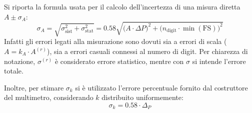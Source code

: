 \label{sec:appendice}
Si riporta la formula usata per il calcolo dell'incertezza di una misura diretta $A \pm \sigma _A$:
\[  \sigma_A =\sqrt{ \sigma_{\textrm{sist}}^2 + \sigma_{\textrm{stat}}^2}= 0.58 \sqrt{\big(A\cdot\Delta P)^2 + (n_{\textrm{digit}} \cdot \min(\textrm{FS})\big)^2}\]
Infatti gli errori legati alla misurazione sono dovuti sia a errori di scala ($ A= k _A \cdot A^{(r)} $), sia a errori casuali connessi al numero di digit. Per chiarezza di notazione, $\sigma^{(r)}$ \`e considerato errore statistico, mentre con $\sigma$ si intende l'errore totale.

Inoltre, per stimare $\sigma _k$ si \`e utilizzato l'errore percentuale fornito dal costruttore del multimetro, considerando $k$ distribuito uniformemente:
\[\sigma _k = 0.58 \cdot \Delta _P \]
